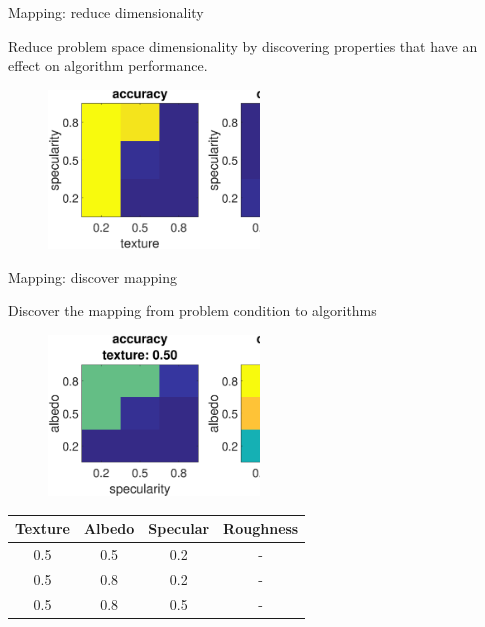 \documentclass[10pt]{beamer}
\begin{document}
\begin{frame}{Mapping: reduce dimensionality}

Reduce problem space dimensionality by discovering properties that have an effect on algorithm performance.
\begin{figure}
\centering
\includegraphics[width=0.5\textwidth]{mapping/eval_prop/mvs_tex_spec}
\end{figure}

\end{frame}

\begin{frame}{Mapping: discover mapping}

Discover the mapping from problem condition to algorithms
\begin{figure}
\centering
\includegraphics[width=0.5\textwidth]{mapping/lookup_table/mvs_texture_05}
\end{figure}

\begin{table}
\centering
\begin{tabular}{*{4}{c}}
\toprule
Texture & Albedo & Specular & Roughness\\
\midrule
0.5 & 0.5 & 0.2 & -\\
0.5 & 0.8 & 0.2 & -\\
0.5 & 0.8 & 0.5 & -\\
\bottomrule
\end{tabular}
\end{table}

\end{frame}
\end{document}
